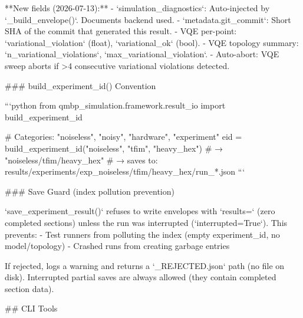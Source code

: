 **New fields (2026-07-13):**
- `simulation_diagnostics`: Auto-injected by `_build_envelope()`. Documents backend used.
- `metadata.git_commit`: Short SHA of the commit that generated this result.
- VQE per-point: `variational_violation` (float), `variational_ok` (bool).
- VQE topology summary: `n_variational_violations`, `max_variational_violation`.
- Auto-abort: VQE sweep aborts if >4 consecutive variational violations detected.

### build_experiment_id() Convention

```python
from qmbp_simulation.framework.result_io import build_experiment_id

# Categories: "noiseless", "noisy", "hardware", "experiment"
eid = build_experiment_id("noiseless", "tfim", "heavy_hex")
# → "noiseless/tfim/heavy_hex"
# → saves to: results/experiments/exp_noiseless/tfim/heavy_hex/run_*.json
```

### Save Guard (index pollution prevention)

`save_experiment_result()` refuses to write envelopes with `results={}` (zero completed
sections) unless the run was interrupted (`interrupted=True`). This prevents:
- Test runners from polluting the index (empty experiment_id, no model/topology)
- Crashed runs from creating garbage entries

If rejected, logs a warning and returns a `_REJECTED.json` path (no file on disk).
Interrupted partial saves are always allowed (they contain completed section data).

## CLI Tools

